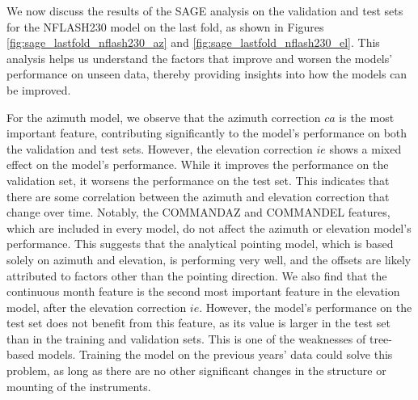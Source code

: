 We now discuss the results of the SAGE analysis on the validation and test sets for the NFLASH230 model on the last fold,
as shown in Figures \ref{fig:sage_lastfold_nflash230_az} and \ref{fig:sage_lastfold_nflash230_el}.
This analysis helps us understand the factors that improve and worsen the models' performance on unseen data, thereby providing insights into how the models can be improved.

For the azimuth model, we observe that the azimuth correction $ca$ is the most important feature, contributing significantly to the model's performance on both the validation and test sets.
However, the elevation correction $ie$ shows a mixed effect on the model's performance.
While it improves the performance on the validation set, it worsens the performance on the test set.
This indicates that there are some correlation between the azimuth and elevation correction that change over time.
Notably, the COMMANDAZ and COMMANDEL features, which are included in every model, do not affect the azimuth or elevation model's performance.
This suggests that the analytical pointing model, which is based solely on azimuth and elevation, is performing very well, and the offsets are likely attributed to factors other than the pointing direction.
We also find that the continuous month feature is the second most important feature in the elevation model, after the elevation correction $ie$.
However, the model's performance on the test set does not benefit from this feature, as its value is larger in the test set than in the training and validation sets.
This is one of the weaknesses of tree-based models.
Training the model on the previous years' data could solve this problem, as long as there are no other significant changes in the structure or mounting of the instruments.

